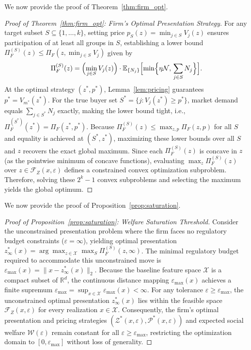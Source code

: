 We now provide the proof of Theorem~\ref{thm:firm_opt}.
\begin{proof}[Proof of Theorem~\ref{thm:firm_opt}: Firm's Optimal Presentation Strategy]\label{app:proof_thm_firm_opt}\label{proof:thm_firm_opt}
For any target subset $S \subseteq \{1, \dots, k\}$, setting price $p_S(z) = \min_{j \in S} V_j(z)$ ensures participation of at least all groups in $S$, establishing a lower bound $\Pi_F^{(S)}(z) \le \Pi_F(z,\min_{j \in S}V_j)$ given by
\begin{equation}
\Pi_F^{(S)}(z) = \Bigl(\min_{j \in S} V_j(z)\Bigr) \cdot \mathbb{E}_{\{N_j\}}\Bigl[\min\Bigl\{\eta \mathcal{N},\, \sum_{j \in S} N_j\Bigr\}\Bigr].
\end{equation}
At the optimal strategy $(z^*, p^*)$, Lemma~\ref{lem:pricing} guarantees $p^* = V_{m^*}(z^*)$. For the true buyer set $S^* = \{j : V_j(z^*) \ge p^*\}$, market demand equals $\sum_{j \in S^*} N_j$ exactly, making the lower bound tight, i.e., $\Pi_F^{(S^*)}(z^*) = \Pi_F(z^*, p^*)$. Because $\Pi_F^{(S)}(z) \le \max_{z,p} \Pi_F(z, p)$ for all $S$ and equality is achieved at $(S^*, z^*)$, maximizing these lower bounds over all $S$ and $z$ recovers the exact global maximum. Since each $\Pi_F^{(S)}(z)$ is concave in $z$ (as the pointwise minimum of concave functions), evaluating $\max_z \Pi_F^{(S)}(z)$ over $z \in \mathcal{F}_Z(x, \varepsilon)$ defines a constrained convex optimization subproblem. Therefore, solving these $2^k - 1$ convex subproblems and selecting the maximum yields the global optimum.
\end{proof}

We now provide the proof of Proposition~\ref{prop:saturation}.
\begin{proof}[Proof of Proposition~\ref{prop:saturation}: Welfare Saturation Threshold]\label{app:proof_prop_saturation}\label{proof:prop_saturation}
Consider the unconstrained presentation problem where the firm faces no regulatory budget constraints ($\varepsilon = \infty$), yielding optimal presentation $z_{\infty}^*(x) = \arg\max_{z \in \mathcal{X}} \max_S \Pi_F^{(S)}(z, \infty)$. The minimal regulatory budget required to accommodate this unconstrained move is $\varepsilon_{\max}(x) = \|x - z_{\infty}^*(x)\|_2$. Because the baseline feature space $\mathcal{X}$ is a compact subset of $\mathbb{R}^d$, the continuous distance mapping $\varepsilon_{\max}(x)$ achieves a finite supremum $\varepsilon_{\max} = \sup_{x \in \mathcal{X}} \varepsilon_{\max}(x) < \infty$. For any tolerance $\varepsilon \ge \varepsilon_{\max}$, the unconstrained optimal presentation $z_{\infty}^*(x)$ lies within the feasible space $\mathcal{F}_Z(x, \varepsilon)$ for every realization $x \in \mathcal{X}$. Consequently, the firm's optimal presentation and pricing strategies $(\mathcal{Z}^*(x, \varepsilon), \mathcal{P}^*(x, \varepsilon))$ and expected social welfare $\mathcal{W}(\varepsilon)$ remain constant for all $\varepsilon \ge \varepsilon_{\max}$, restricting the optimization domain to $[0, \varepsilon_{\max}]$ without loss of generality.
\end{proof}

